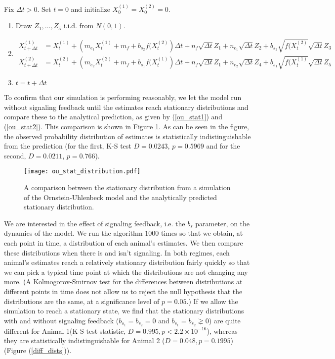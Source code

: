 \documentclass{article}
\begin{document}
\noindent Fix $\Delta t>0$.  Set $t=0$ and initialize $X_0^{(1)}=X_0^{(2)}=0$.

\begin{enumerate}
\item Draw $Z_1,\dots,Z_5$ i.i.d. from $N(0,1)$.
\item \begin{align*}
X_{t+\Delta t}^{(1)}&=X_t^{(1)}+\left(m_{e_1}X_t^{(1)}+m_f+b_{s_2}f(X_t^{(2)}\right)\Delta t+n_f\sqrt{\Delta t}Z_1+n_{e_1}\sqrt{\Delta t}Z_2+b_{s_2}\sqrt{f(X_t^{(2)}}\sqrt{\Delta t}Z_3\\
X_{t+\Delta t}^{(2)}&=X_t^{(2)}+\left(m_{e_2}X_t^{(2)}+m_f+b_{s_1}f(X_t^{(1)}\right)\Delta t+n_f\sqrt{\Delta t}Z_1+n_{e_2}\sqrt{\Delta t}Z_4+b_{s_1}\sqrt{f(X_t^{(1)}}\sqrt{\Delta t}Z_5
\end{align*}
\item $t=t+\Delta t$


\end{enumerate}

To confirm that our simulation is performing reasonably, we let the model run without signaling feedback until the estimates reach stationary distributions and compare these to the analytical prediction, as given by (\ref{ou_stat1}) and (\ref{ou_stat2}).  This comparison is shown in Figure \ref{ou_stat_dist}.  As can be seen in the figure, the observed probability distribution of estimates is statistically indistinguishable from the prediction (for the first, K-S test $D=0.0243$, $p=0.5969$ and for the second, $D=0.0211$, $p=0.766$).

\begin{figure}
\begin{center}
\texttt{[image: ou\_stat\_distribution.pdf]} \end{center}
\caption{\label{ou_stat_dist} A comparison between the stationary distribution from a simulation of the Ornstein-Uhlenbeck model and the analytically predicted stationary distribution.}
\end{figure}

We are interested in the effect of signaling feedback, i.e. the $b_s$ parameter, on the dynamics of the model.  We run the algorithm $1000$ times so that we obtain, at each point in time, a distribution of each animal's estimates.  We then compare these distributions when there is and isn't signaling.  In both regimes, each animal's estimates reach a relatively stationary distribution fairly quickly so that we can pick a typical time point at which the distributions are not changing any more.  (A Kolmogorov-Smirnov test for the differences between distributions at different points in time does not allow us to reject the null hypothesis that the distributions are the same, at a significance level of $p=0.05$.)  If we allow the simulation to reach a stationary state, we find that the stationary distributions with and without signaling feedback ($b_{s_1}=b_{s_2}=0$ and $b_{s_1}=b_{s_2}\gneq 0$) are quite different for Animal 1(K-S test statistic, $D=0.995,p<2.2\times10^{-16}$), whereas they are statistically indistinguishable for Animal 2 ($D=0.048, p=0.1995$) (Figure (\ref{diff_dists})).   
\end{document}
